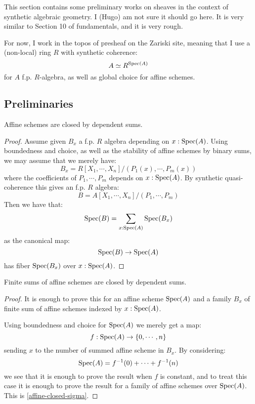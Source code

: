 This section contains some preliminary works on sheaves in the context of synthetic algebraic geometry. I (Hugo) am not sure it should go here. It is very similar to Section 10 of fundamentals, and it is very rough.

For now, I work in the topos of presheaf on the Zariski site, meaning that I use a (non-local) ring $R$ with synthetic coherence:
\[ A \simeq R^{\operatorname{Spec}(A)} \]
for $A$ f.p. $R$-algebra, as well as global choice for affine schemes.

\subsection{Preliminaries}

\begin{lemma}\label{affine-closed-sigma}
Affine schemes are closed by dependent sums.
\end{lemma}

\begin{proof}
Assume given $B_x$ a f.p. $R$ algebra depending on $x:\operatorname{Spec}(A)$. Using boundedness and choice, as well as the stability of affine schemes by binary sums, we may assume that we merely have:
\[B_x = R[X_1,\cdots,X_n]/(P_1(x),\cdots, P_m(x))\]
where the coefficients of $P_1,\cdots,P_m$ depends on $x:\operatorname{Spec}(A)$. By synthetic quasi-coherence this gives an f.p. $R$ algebra:
\[B = A[X_1,\cdots,X_n]/(P_1,\cdots, P_m)\]
Then we have that:
\[\operatorname{Spec}(B) = \sum_{x:\operatorname{Spec}(A)} \operatorname{Spec}(B_x)\]
as the canonical map:
\[\operatorname{Spec}(B) \to \operatorname{Spec}(A)\]
has fiber $\operatorname{Spec}(B_x)$ over $x:\operatorname{Spec}(A)$.
\end{proof}

\begin{lemma}\label{sum-affine-closed-sigma}
Finite sums of affine schemes are closed by dependent sums.
\end{lemma}

\begin{proof}
It is enough to prove this for an affine scheme $\operatorname{Spec}(A)$ and a family $B_x$ of finite sum of affine schemes indexed by $x:\operatorname{Spec}(A)$.

Using boundedness and choice for $\operatorname{Spec}(A)$ we merely get a map:
\[f:\operatorname{Spec}(A) \to \{0,\cdots,n\}\]
sending $x$ to the number of summed affine scheme in $B_x$. By considering:
\[\operatorname{Spec}(A) = f^{-1}(0) + \cdots + f^{-1}(n)\]
we see that it is enough to prove the result when $f$ is constant, and to treat this case it is enough to prove the result for a family of affine schemes over $\operatorname{Spec}(A)$. This is \cref{affine-closed-sigma}.
\end{proof}


